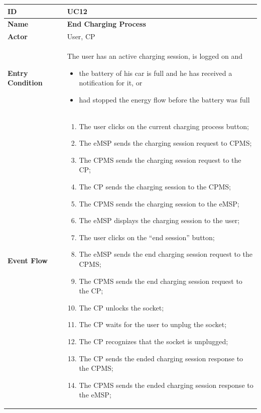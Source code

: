\documentclass{Configuration_Files/PoliMi3i_thesis}
\begin{document}
\begin{table}[H]
    \begin{xltabular}{\textwidth}{| >{}l | X |}
    \hline
    \textbf{ID} & \textbf{UC12}\T\B\\
    \hline
    \textbf{Name} & \textbf{End Charging Process}\T\B\\
    \hline \hline
    \textbf{Actor} & User, CP\T\B \\
    \hline
    \textbf{Entry Condition} & The user has an active charging session, is logged on and
        \begin{itemize}
            \item the battery of his car is full and he has received a notification for it, or
            \item had stopped the energy flow before the battery was full
        \end{itemize}\T\B\\
    \hline
    \textbf{Event Flow} & 
        \begin{enumerate}
        \item The user clicks on the current charging process button;
        \item The eMSP sends the charging session request to CPMS;
        \item The CPMS sends the charging session request to the CP;
        \item The CP sends the charging session to the CPMS;
        \item The CPMS sends the charging session to the eMSP;
        \item The eMSP displays the charging session to the user;
        \item The user clicks on the “end session” button;
        \item The eMSP sends the end charging session request to the CPMS;
        \item The CPMS sends the end charging session request to the CP;
        \item The CP unlocks the socket;
        \item The CP waits for the user to unplug the socket;
        \item The CP recognizes that the socket is unplugged;
        \item The CP sends the ended charging session response to the CPMS;
        \item The CPMS sends the ended charging session response to the eMSP;

\end{enumerate}
\end{xltabular}
\end{table}
\end{document}
